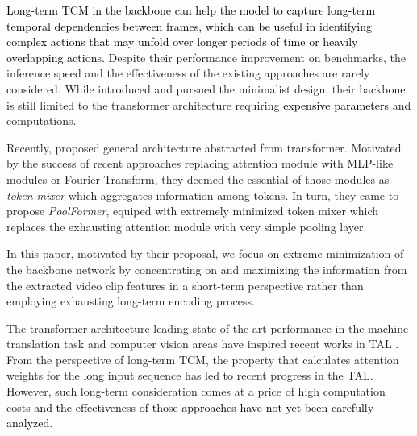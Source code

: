 \documentclass[10pt,twocolumn,letterpaper]{article}
\newcommand{\ky}[1]{\textcolor{black}{{#1}}}
\newcommand{\tuan}[1]{\textcolor{black}{{#1}}}
\begin{document}
\ky{Long-term TCM} \tuan{in the backbone} \ky{can help the model to capture long-term temporal dependencies between frames, which can be useful in identifying complex actions that may unfold over longer periods of time or heavily overlapping actions.}
Despite their performance improvement on benchmarks, the inference speed and the effectiveness of the existing approaches are rarely considered. While \cite{zhang2022actionformer} introduced and pursued the minimalist design, their backbone is still limited to the transformer architecture requiring \tuan{expensive parameters} and computations.

Recently, \cite{yu2022metaformer} proposed general architecture abstracted from transformer. 
Motivated by the success of recent approaches replacing attention module with MLP-like modules\cite{tolstikhin2021mlp} or Fourier Transform\cite{lee2021fnet}, they deemed the essential of those modules as \textit{token mixer} which aggregates information among tokens. In turn, they came to propose \textit{PoolFormer}, equiped with extremely minimized token mixer which replaces the exhausting attention module with very simple pooling layer. 

In this paper, motivated by their proposal, we focus on extreme minimization of the backbone network by concentrating on and maximizing the information from the extracted video clip features in a short-term perspective rather than employing exhausting long-term encoding process. 

The transformer architecture leading state-of-the-art performance in the machine translation task \cite{vaswani2017attention} and computer vision areas \cite{dosovitskiy2020image} have inspired recent works in TAL \cite{zhang2022actionformer, liu2022end, zhao2021actionness, kang2022htnet}. From the perspective of long-term TCM, the property that calculates attention weights for the \tuan{long} input sequence has led to recent progress in the TAL. However, such long-term consideration comes at a price of high computation costs \tuan{and the effectiveness of those approaches have not yet been carefully analyzed}. 
\end{document}
